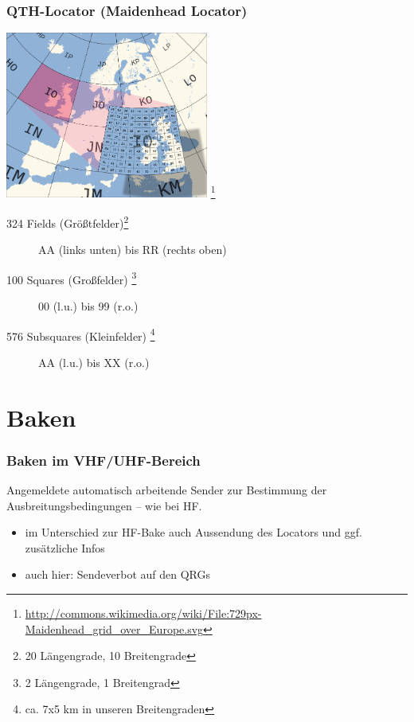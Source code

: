 \begin{frame}
    \frametitle{QTH-Locator (Maidenhead Locator)}

    \begin{center}
        \includegraphics[width=0.5\textwidth,height=.3\textheight,keepaspectratio]{bv11/Maidenhead_grid_over_Europe.png}
        \footnote{\tiny \url{http://commons.wikimedia.org/wiki/File:729px-Maidenhead_grid_over_Europe.svg}}
    \end{center}

    \begin{description}
        \item[324 Fields (Größtfelder)\footnote{20 Längengrade, 10 Breitengrade}] AA (links unten) bis RR (rechts oben)
        \item[100 Squares (Großfelder) \footnote{2 Längengrade, 1 Breitengrad}] 00 (l.u.) bis 99 (r.o.)
        \item[576 Subsquares (Kleinfelder) \footnote{ca. 7x5 km in unseren Breitengraden}] AA (l.u.) bis XX (r.o.)
    \end{description}

\end{frame}

\section{Baken}

\begin{frame}
    \frametitle{Baken im VHF/UHF-Bereich}

    Angemeldete automatisch arbeitende Sender zur Bestimmung der
	Ausbreitungsbedingungen -- wie bei HF.

    \begin{itemize}
        \item im Unterschied zur HF-Bake auch Aussendung des Locators und ggf.
              zusätzliche Infos
        \item auch hier: Sendeverbot auf den QRGs
    \end{itemize}

\end{frame}

